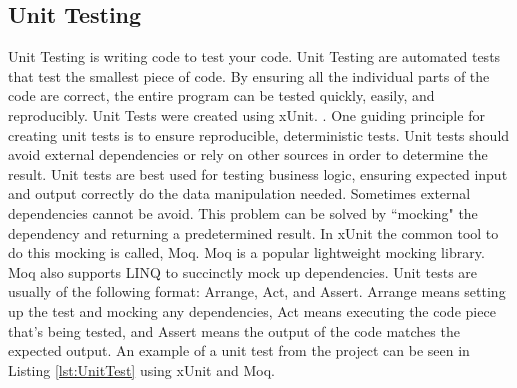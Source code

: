 \subsection{Unit Testing}
Unit Testing is writing code to test your code. Unit Testing are automated tests that test the smallest piece of code. By ensuring all the individual parts of the code are correct, the entire program can be tested quickly, easily, and reproducibly. Unit Tests were created using xUnit. . One guiding principle for creating unit tests is to ensure reproducible, deterministic tests. Unit tests should avoid external dependencies or rely on other sources in order to determine the result. Unit tests are best used for testing business logic, ensuring expected input and output correctly do the data manipulation needed. Sometimes external dependencies cannot be avoid. This problem can be solved by ``mocking" the dependency and returning a predetermined result. In xUnit the common tool to do this mocking is called, Moq. Moq is a popular lightweight mocking library. Moq also supports LINQ to succinctly mock up dependencies. Unit tests are usually of the following format: Arrange, Act, and Assert. Arrange means setting up the test and mocking any dependencies, Act means executing the code piece that's being tested, and Assert means the output of the code matches the expected output. An example of a unit test from the project can be seen in Listing \ref{lst:UnitTest} using xUnit and Moq.

